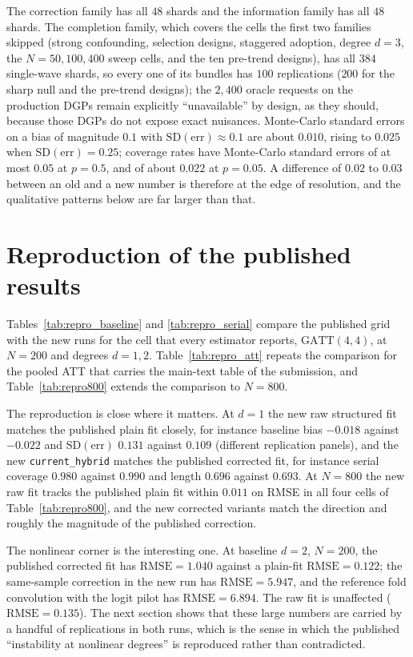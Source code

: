 \documentclass[11pt]{article}
\begin{document}
The correction family has all $48$ shards and the information family has all $48$
shards. The completion family, which covers the cells the first two families
skipped (strong confounding, selection designs, staggered adoption, degree $d=3$,
the $N=50,100,400$ sweep cells, and the ten pre-trend designs), has all $384$
single-wave shards, so every one of its bundles has $100$ replications ($200$ for
the sharp null and the pre-trend designs); the $2{,}400$ oracle requests on the
production DGPs remain explicitly ``unavailable'' by
design, as they should, because those DGPs do not expose exact nuisances. Monte-Carlo
standard errors on a bias of magnitude $0.1$ with $\mathrm{SD(err)}\approx0.1$ are about
$0.010$, rising to $0.025$ when $\mathrm{SD(err)}=0.25$; coverage rates have Monte-Carlo
standard errors of at most $0.05$ at $p=0.5$, and of about $0.022$ at $p=0.05$. A
difference of $0.02$ to $0.03$ between an old and a new number is therefore at the edge
of resolution, and the qualitative patterns below are far larger than that.

\section{Reproduction of the published results}
\label{sec:reproduction}

Tables~\ref{tab:repro_baseline} and \ref{tab:repro_serial} compare the published grid
with the new runs for the cell that every estimator reports, $\mathrm{GATT}(4,4)$, at
$N=200$ and degrees $d=1,2$. Table~\ref{tab:repro_att} repeats the comparison for the
pooled ATT that carries the main-text table of the submission, and
Table~\ref{tab:repro800} extends the comparison to $N=800$.

The reproduction is close where it matters. At $d=1$ the new raw structured fit matches
the published plain fit closely, for instance baseline bias $-0.018$ against $-0.022$ and
$\mathrm{SD(err)}$ $0.131$ against $0.109$ (different replication panels), and the new
\texttt{current\_hybrid} matches the published corrected fit, for instance serial
coverage $0.980$ against $0.990$ and length $0.696$ against $0.693$. At $N=800$ the new
raw fit tracks the published plain fit within $0.011$ on RMSE in all four cells of
Table~\ref{tab:repro800}, and the new corrected variants match the direction and roughly
the magnitude of the published correction.

The nonlinear corner is the interesting one. At baseline $d=2$, $N=200$, the published
corrected fit has $\mathrm{RMSE}=1.040$ against a plain-fit $\mathrm{RMSE}=0.122$; the
same-sample correction in the new run has $\mathrm{RMSE}=5.947$, and the reference fold
convolution with the logit pilot has $\mathrm{RMSE}=6.894$. The raw fit is unaffected
($\mathrm{RMSE}=0.135$). The next section shows that these large numbers are carried by
a handful of replications in both runs, which is the sense in which the published
``instability at nonlinear degrees'' is reproduced rather than contradicted.
\end{document}
